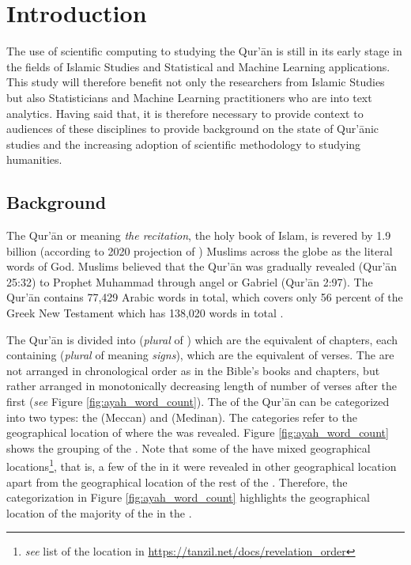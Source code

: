 \chapter{Introduction}
\label{ch:introduction}
The use of scientific computing to studying the Qur'\=an is still in its early stage in the fields of Islamic Studies and Statistical and Machine Learning applications. This study will therefore benefit not only the researchers from Islamic Studies but also Statisticians and Machine Learning practitioners who are into text analytics. Having said that, it is therefore necessary to provide context to audiences of these disciplines to provide background on the state of Qur'\=anic studies and the increasing adoption of scientific methodology to studying humanities.
\section{Background}
The Qur'\=an or   meaning \textit{the recitation}, the holy book of Islam, is revered by 1.9 billion (according to 2020 projection of ) Muslims across the globe as the literal words of God. Muslims believed that the Qur'\=an was gradually revealed (Qur'\=an 25:32) to Prophet Muhammad  through angel   or Gabriel (Qur'\=an 2:97). The Qur'\=an contains 77,429 Arabic words in total, which covers only 56 percent of the Greek New Testament which has 138,020 words in total \cite[p.~11]{sinai2017}. 

The Qur'\=an is divided into   (\textit{plural} of  ) which are the equivalent of chapters, each containing   (\textit{plural} of   meaning \textit{signs}), which are the equivalent of verses. The   are not arranged in chronological order as in the Bible's books and chapters, but rather arranged in monotonically decreasing length of number of verses after the first   (\textit{see} Figure \ref{fig:ayah_word_count}). The   of the Qur'\=an can be categorized into two types: the   (Meccan) and   (Medinan). The categories refer to the geographical location of where the   was revealed. Figure \ref{fig:ayah_word_count} shows the grouping of the  . Note that some of the   have mixed geographical locations\footnote{\textit{see} list of the location in \url{https://tanzil.net/docs/revelation_order}}, that is, a few of the   in it were revealed in other geographical location apart from the geographical location of the rest of the  . Therefore, the categorization in Figure \ref{fig:ayah_word_count} highlights the geographical location of the majority of the   in the  .

